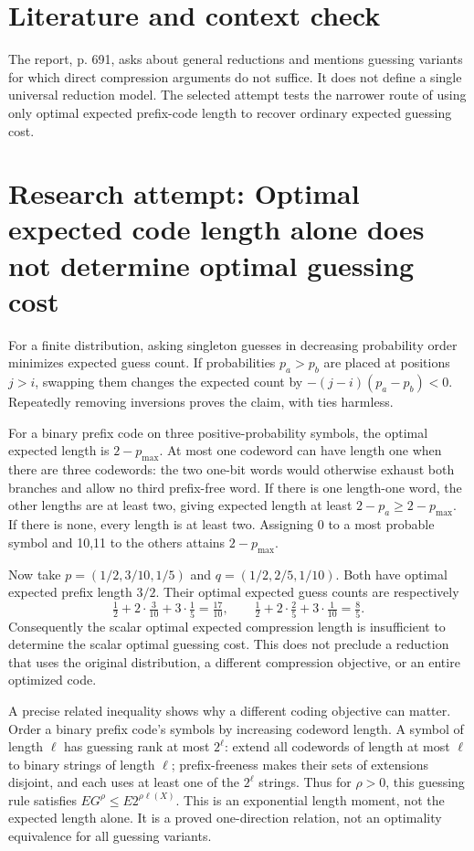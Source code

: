 \documentclass[11pt]{article}
\begin{document}
\section{Literature and context check}
The report, p. 691, asks about general reductions and mentions guessing variants for which direct compression arguments do not suffice. It does not define a single universal reduction model. The selected attempt tests the narrower route of using only optimal expected prefix-code length to recover ordinary expected guessing cost.
\section{Research attempt: Optimal expected code length alone does not determine optimal guessing cost}
For a finite distribution, asking singleton guesses in decreasing probability order minimizes expected guess count. If probabilities $p_a>p_b$ are placed at positions $j>i$, swapping them changes the expected count by $-(j-i)(p_a-p_b)<0$. Repeatedly removing inversions proves the claim, with ties harmless.

For a binary prefix code on three positive-probability symbols, the optimal expected length is $2-p_{\max}$. At most one codeword can have length one when there are three codewords: the two one-bit words would otherwise exhaust both branches and allow no third prefix-free word. If there is one length-one word, the other lengths are at least two, giving expected length at least $2-p_a\ge2-p_{\max}$. If there is none, every length is at least two. Assigning 0 to a most probable symbol and 10,11 to the others attains $2-p_{\max}$.

Now take $p=(1/2,3/10,1/5)$ and $q=(1/2,2/5,1/10)$. Both have optimal expected prefix length $3/2$. Their optimal expected guess counts are respectively
\[
\tfrac12+2\cdot\tfrac3{10}+3\cdot\tfrac15=\tfrac{17}{10},\qquad
\tfrac12+2\cdot\tfrac25+3\cdot\tfrac1{10}=\tfrac85.
\]
Consequently the scalar optimal expected compression length is insufficient to determine the scalar optimal guessing cost. This does not preclude a reduction that uses the original distribution, a different compression objective, or an entire optimized code.

A precise related inequality shows why a different coding objective can matter. Order a binary prefix code's symbols by increasing codeword length. A symbol of length $\ell$ has guessing rank at most $2^\ell$: extend all codewords of length at most $\ell$ to binary strings of length $\ell$; prefix-freeness makes their sets of extensions disjoint, and each uses at least one of the $2^\ell$ strings. Thus for $\rho>0$, this guessing rule satisfies $E G^\rho\le E2^{\rho\ell(X)}$. This is an exponential length moment, not the expected length alone. It is a proved one-direction relation, not an optimality equivalence for all guessing variants.
\end{document}
